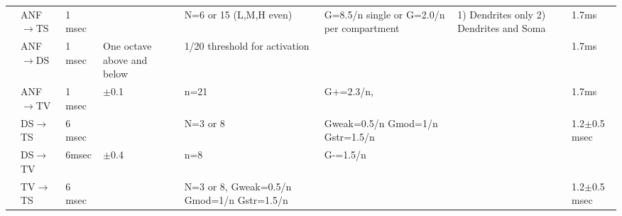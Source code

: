 \begin{longtable}{cXXXXXXX}
          \citep{ErikssonRobert:1999}            &  ANF\ensuremath{\rightarrow}TS  &                                                       1 msec                                                       &                                                           &          N=6 or 15 (L,M,H even)           &                    G=8.5/n single or G=2.0/n per compartment                    &  1) Dendrites only 2) Dendrites and Soma  & 1.7ms \\
                                                 & {ANF\ensuremath{\rightarrow}DS} &                                                     {1 msec }                                                      &               {One octave above and below }               &     {1/20 threshold for activation }      &                                                                                 &                                           & 1.7ms \\
                                                 &  ANF\ensuremath{\rightarrow}TV  &                                                       1 msec                                                       &                         $\pm$0.1                          &                   n=21                    &                                    G+=2.3/n,                                    &                                           & 1.7ms\\ 
                                                 &  DS\ensuremath{\rightarrow}TS   &                                                       6 msec                                                       &                                                           &                 N=3 or 8                  &                         Gweak=0.5/n Gmod=1/n Gstr=1.5/n                         &                                           & 1.2$\pm$0.5 msec \\ 
                                                 &  DS\ensuremath{\rightarrow}TV   &                                                       6msec                                                        &                         $\pm$0.4                          &                    n=8                    &                                    G-=1.5/n                                     &                                           & \\ 
                                                 &  TV\ensuremath{\rightarrow}TS   &                                                       6 msec                                                       &                                                           & N=3 or 8, Gweak=0.5/n Gmod=1/n Gstr=1.5/n &                                                                                 &                                           & 1.2$\pm$0.5 msec \\ 

\end{longtable}
